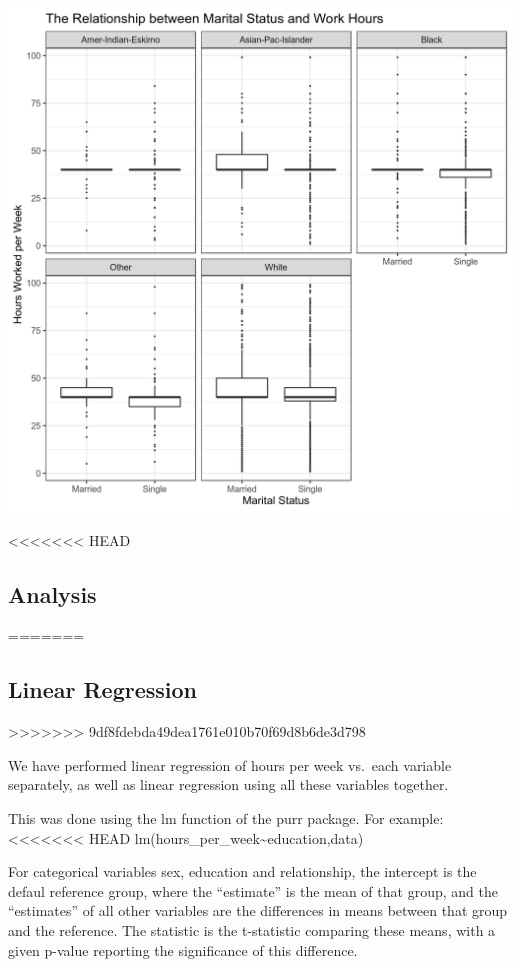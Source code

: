 \documentclass[]{article}
\begin{document}
\includegraphics{../images/Plot_4_Marital_Status_and_Work_Hours.png}

<<<<<<< HEAD
\hypertarget{analysis}{%
\subsection{Analysis}\label{analysis}}
=======
\hypertarget{linear-regression}{%
\subsection{Linear Regression}\label{linear-regression}}
>>>>>>> 9df8fdebda49dea1761e010b70f69d8b6de3d798

We have performed linear regression of hours per week vs.~each variable
separately, as well as linear regression using all these variables
together.

This was done using the lm function of the purr package. For example:
<<<<<<< HEAD
lm(hours\_per\_week\textasciitilde{}education,data)

For categorical variables sex, education and relationship, the intercept
is the defaul reference group, where the ``estimate'' is the mean of
that group, and the ``estimates'' of all other variables are the
differences in means between that group and the reference. The statistic
is the t-statistic comparing these means, with a given p-value reporting
the significance of this difference.
\end{document}
